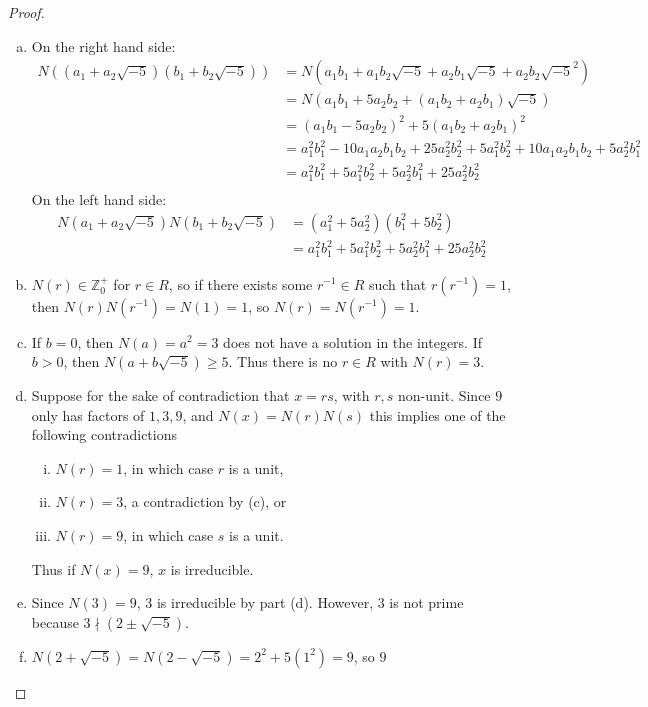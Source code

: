 \documentclass{article}
\begin{document}
\begin{proof}
  \begin{enumerate}[(a)]
    \item On the right hand side: \begin{align*}
      N((a_1 + a_2\sqrt{-5})(b_1 + b_2\sqrt{-5}))
      &= N(a_1b_1 + a_1b_2\sqrt{-5} + a_2b_1\sqrt{-5} + a_2b_2\sqrt{-5}^2) \\
      &= N(a_1b_1 + 5a_2b_2 + (a_1b_2 + a_2b_1)\sqrt{-5}) \\
      &= (a_1b_1 - 5a_2b_2)^2 + 5(a_1b_2 + a_2b_1)^2 \\
      &= a_1^2b_1^2 -10a_1a_2b_1b_2 + 25a_2^2b_2^2 + 5a_1^2b_2^2 + 10a_1a_2b_1b_2 + 5a_2^2b_1^2 \\
      &= a_1^2b_1^2 + 5a_1^2b_2^2 + 5a_2^2b_1^2 + 25a_2^2b_2^2 \\
    \end{align*}
    On the left hand side:
    \begin{align*}
      N(a_1 + a_2\sqrt{-5})N(b_1 + b_2\sqrt{-5})
      &= (a_1^2 + 5a_2^2)(b_1^2 + 5b_2^2) \\
      &= a_1^2b_1^2 + 5a_1^2b_2^2 + 5a_2^2b_1^2 + 25a_2^2b_2^2
    \end{align*}
    \item $N(r) \in \mathbb Z_0^+$ for $r \in R$, so if there exists some
    $r^{-1} \in R$ such that $r(r^{-1}) = 1$, then $N(r)N(r^{-1}) = N(1) = 1$,
    so $N(r) = N(r^{-1}) = 1$.
    \item If $b = 0$, then $N(a) = a^2 = 3$ does not have a solution in the
      integers. If $b > 0$, then $N(a + b\sqrt{-5}) \geq 5$.
      Thus there is no $r \in R$ with $N(r) = 3$.
    \item Suppose for the sake of contradiction that $x = rs$, with $r, s$
    non-unit. Since $9$ only has factors of $1, 3, 9$, and $N(x) = N(r)N(s)$
    this implies one of the following contradictions \begin{enumerate}[(i)]
      \item $N(r) = 1$, in which case $r$ is a unit,
      \item $N(r) = 3$, a contradiction by (c), or
      \item $N(r) = 9$, in which case $s$ is a unit.
    \end{enumerate}
    Thus if $N(x) = 9$, $x$ is irreducible.
    \item Since $N(3) = 9$, $3$ is irreducible by part (d). However, $3$ is not
    prime because $3 \nmid (2 \pm \sqrt{-5})$.
    \item $N(2 + \sqrt{-5}) = N(2 - \sqrt{-5}) = 2^2 + 5(1^2) = 9$, so $9$

\end{enumerate}
\end{proof}
\end{document}
